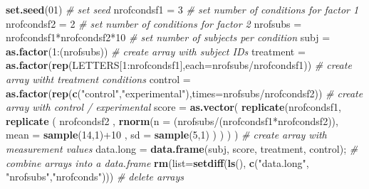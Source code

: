\documentclass[]{article}
\newenvironment{Shaded}{\begin{snugshade}}{\end{snugshade}}
\newcommand{\KeywordTok}[1]{\textcolor[rgb]{0.13,0.29,0.53}{\textbf{{#1}}}}
\newcommand{\DataTypeTok}[1]{\textcolor[rgb]{0.13,0.29,0.53}{{#1}}}
\newcommand{\DecValTok}[1]{\textcolor[rgb]{0.00,0.00,0.81}{{#1}}}
\newcommand{\StringTok}[1]{\textcolor[rgb]{0.31,0.60,0.02}{{#1}}}
\newcommand{\CommentTok}[1]{\textcolor[rgb]{0.56,0.35,0.01}{\textit{{#1}}}}
\newcommand{\NormalTok}[1]{{#1}}
\begin{document}
\begin{Shaded}
\begin{Highlighting}[]
\KeywordTok{set.seed}\NormalTok{(}\DecValTok{01}\NormalTok{)   }\CommentTok{# set seed}
\NormalTok{nrofcondsf1 =}\StringTok{ }\DecValTok{3}  \CommentTok{# set number of conditions for factor 1}
\NormalTok{nrofcondsf2 =}\StringTok{ }\DecValTok{2}  \CommentTok{# set number of conditions for factor 2}
\NormalTok{nrofsubs    =}\StringTok{ }\NormalTok{nrofcondsf1*nrofcondsf2*}\DecValTok{10} \CommentTok{# set number of subjects per condition}
\NormalTok{subj =}\StringTok{ }\KeywordTok{as.factor}\NormalTok{(}\DecValTok{1}\NormalTok{:(nrofsubs))      }\CommentTok{# create array with subject IDs}
\NormalTok{treatment =}\StringTok{ }\KeywordTok{as.factor}\NormalTok{(}\KeywordTok{rep}\NormalTok{(LETTERS[}\DecValTok{1}\NormalTok{:nrofcondsf1],}\DataTypeTok{each=}\NormalTok{nrofsubs/nrofcondsf1))   }\CommentTok{# create array witht treatment conditions}
\NormalTok{control   =}\StringTok{ }\KeywordTok{as.factor}\NormalTok{(}\KeywordTok{rep}\NormalTok{(}\KeywordTok{c}\NormalTok{(}\StringTok{"control"}\NormalTok{,}\StringTok{"experimental"}\NormalTok{),}\DataTypeTok{times=}\NormalTok{nrofsubs/nrofcondsf2))   }\CommentTok{# create array with control / experimental}
\NormalTok{score =}\StringTok{ }\KeywordTok{as.vector}\NormalTok{( }\KeywordTok{replicate}\NormalTok{(nrofcondsf1, }\KeywordTok{replicate} \NormalTok{( }
          \NormalTok{nrofcondsf2 , }\KeywordTok{rnorm}\NormalTok{(}\DataTypeTok{n =} \NormalTok{(nrofsubs/(nrofcondsf1*nrofcondsf2)), }\DataTypeTok{mean =} \KeywordTok{sample}\NormalTok{(}\DecValTok{14}\NormalTok{,}\DecValTok{1}\NormalTok{)+}\DecValTok{10} \NormalTok{, }\DataTypeTok{sd =} \KeywordTok{sample}\NormalTok{(}\DecValTok{5}\NormalTok{,}\DecValTok{1}\NormalTok{) ) }
        \NormalTok{) ) )                                    }\CommentTok{# create array with measurement values}
\NormalTok{data.long =}\StringTok{ }\KeywordTok{data.frame}\NormalTok{(subj, score, treatment, control);      }\CommentTok{# combine arrays into a data.frame}
\KeywordTok{rm}\NormalTok{(}\DataTypeTok{list=}\KeywordTok{setdiff}\NormalTok{(}\KeywordTok{ls}\NormalTok{(), }\KeywordTok{c}\NormalTok{(}\StringTok{"data.long"}\NormalTok{, }\StringTok{"nrofsubs"}\NormalTok{,}\StringTok{"nrofconds"}\NormalTok{))) }\CommentTok{# delete arrays}
\end{Highlighting}
\end{Shaded}
\end{document}
